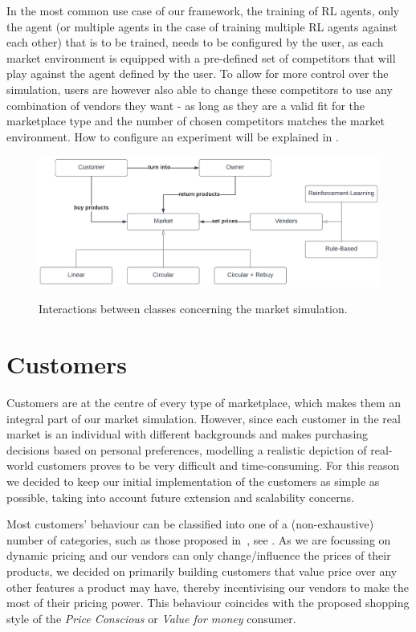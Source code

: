 In the most common use case of our framework, the training of RL agents, only the agent (or multiple agents in the case of training multiple RL agents against each other) that is to be trained, needs to be configured by the user, as each market environment is equipped with a pre-defined set of competitors that will play against the agent defined by the user. To allow for more control over the simulation, users are however also able to change these competitors to use any combination of vendors they want - as long as they are a valid fit for the marketplace type and the number of chosen competitors matches the market environment. How to configure an experiment will be explained in .

\begin{figure}[t]
	\centering
	\includegraphics[width = \textwidth]{images/overview_diagram.pdf}\\
	\caption{Interactions between classes concerning the market simulation.\\}\label{fig:OverviewDiagram}
\end{figure}

\section{Customers}\label{sec:Customers}

Customers are at the centre of every type of marketplace, which makes them an integral part of our market simulation. However, since each customer in the real market is an individual with different backgrounds and makes purchasing decisions based on personal preferences, modelling a realistic depiction of real-world customers proves to be very difficult and time-consuming. For this reason we decided to keep our initial implementation of the customers as simple as possible, taking into account future extension and scalability concerns.

Most customers' behaviour can be classified into one of a (non-exhaustive) number of categories, such as those proposed in~\cite{ShoppingStyles}, see . As we are focussing on dynamic pricing and our vendors can only change/influence the prices of their products, we decided on primarily building customers that value price over any other features a product may have, thereby incentivising our vendors to make the most of their pricing power. This behaviour coincides with the proposed shopping style of the \emph{Price Conscious} or \emph{Value for money} consumer.

